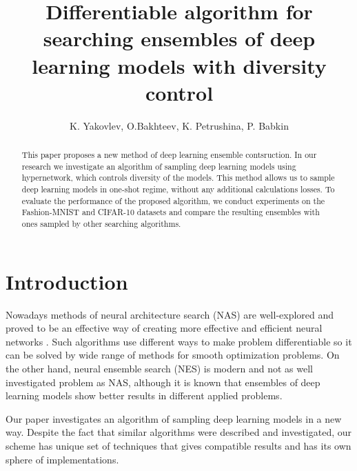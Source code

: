 \documentclass{article}
\title{Differentiable algorithm for searching ensembles of deep learning models with diversity control}
\author{K. Yakovlev, O.Bakhteev, K. Petrushina, P. Babkin
}
\date{}
\begin{document}
\maketitle

\begin{abstract}
	
This paper proposes a new method of deep learning ensemble contsruction.
In our research we investigate an algorithm of sampling deep learning models using
hypernetwork, which controls diversity of the models. This method allows us to sample deep learning models in one-shot regime,
without any additional calculations losses.
To evaluate the performance of the proposed algorithm, we conduct experiments on the Fashion-MNIST and CIFAR-10
datasets and compare the resulting ensembles with ones sampled by other searching algorithms.

\end{abstract}



\section{Introduction}

Nowadays methods of neural architecture search (NAS) are well-explored and proved to be an effective way of creating
more effective and efficient neural networks \citep{darts, robustify, xnas}. Such algorithms use different ways to make problem differentiable so it can
be solved by wide range of methods for smooth optimization problems. On the other hand, neural ensemble search (NES) is
modern and not as well investigated problem as NAS, although it is known that ensembles of deep learning models show better
results in different applied problems.

Our paper investigates an algorithm of sampling deep learning models in a new way. Despite the fact that similar algorithms
were described and investigated, our scheme has unique set of techniques that gives compatible results and has its own sphere
of implementations.
\end{document}
